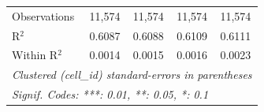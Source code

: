 \begin{table}[htbp]
\begin{tabular}{lcccc}
      Observations                     & 11,574        & 11,574   & 11,574        & 11,574\\  
      R$^2$                            & 0.6087        & 0.6088   & 0.6109        & 0.6111\\  
      Within R$^2$                     & 0.0014        & 0.0015   & 0.0016        & 0.0023\\  
      \midrule \midrule
      \multicolumn{5}{l}{\emph{Clustered (cell\_id) standard-errors in parentheses}}\\
      \multicolumn{5}{l}{\emph{Signif. Codes: ***: 0.01, **: 0.05, *: 0.1}}\\
   \end{tabular}
\end{table}


